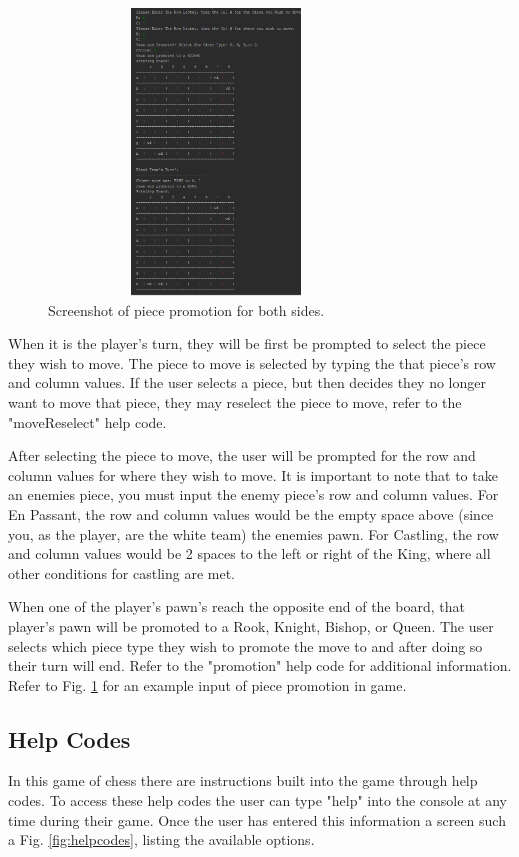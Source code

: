 \documentclass[conference]{IEEEtran}
\begin{document}
\begin{figure}[t!]
	\centering
	\includegraphics[clip,trim=0cm 0cm 3cm 0cm, width=3.5in, height=3in]{ss_promo}
	\caption{Screenshot of piece promotion for both sides.}
	\label{fig:piecepromo}
\end{figure}

When it is the player's turn, they will be first be prompted to select the piece they wish to move. The piece to move is selected by typing the that piece's row and column values. If the user selects a piece, but then decides they no longer want to move that piece, they may reselect the piece to move, refer to the "moveReselect" help code.

After selecting the piece to move, the user will be prompted for the row and column values for where they wish to move. It is important to note that to take an enemies piece, you must input the enemy piece's row and column values. For En Passant, the row and column values would be the empty space above (since you, as the player, are the white team) the enemies pawn. For Castling, the row and column values would be 2 spaces to the left or right of the King, where all other conditions for castling are met.

When one of the player's pawn's reach the opposite end of the board, that player's pawn will be promoted to a Rook, Knight, Bishop, or Queen. The user selects which piece type they wish to promote the move to and after doing so their turn will end. Refer to the "promotion" help code for additional information. Refer to Fig. \ref{fig:piecepromo} for an example input of piece promotion in game. 


\subsection{Help Codes}
In this game of chess there are instructions built into the game through help codes. To access these help codes the user can type "help" into the console at any time during their game. Once the user has entered this information a screen such a Fig. \ref{fig:helpcodes}, listing the available options. \\
\end{document}
